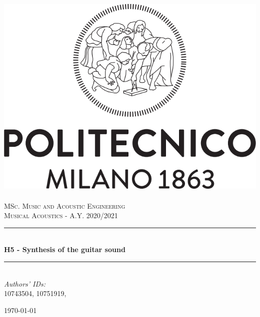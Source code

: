 \documentclass[a4paper]{article}
\title{}
\author{}
\begin{document}
\begin{titlepage}	
	\newcommand{\HRule}{\rule{\linewidth}{0.5mm}} %
	
	\center %
	
	
	\includegraphics[width=.4\textwidth]{Logo_Politecnico_Milano.png}\\[0.4cm]
	\textsc{\LARGE}\\[0.3cm] %
	
	\textsc{\large MSc. Music and Acoustic Engineering}\\[1cm] %
	
	\textsc{\Large Musical Acoustics - A.Y. 2020/2021}\\[0.5cm] %
	
	
	\HRule\\[0.4cm]
	
	{\huge\bfseries H5 - Synthesis of the guitar sound }\\[0.4cm] %
	
	\HRule\\[1.5cm]
	
	
	
	{\large\textit{Authors' IDs:}}\\
	10743504, 10751919, %
	
	
	\vfill\vfill\vfill %
	
	{\large\today} %
	
	
	\vfill\vfill
	
	
	\vfill %
	
	
\end{titlepage}
\end{document}
